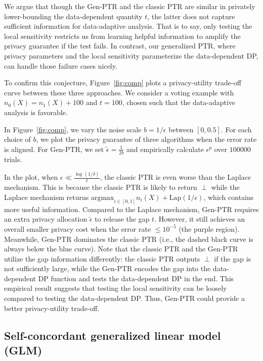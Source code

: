 We argue that though the Gen-PTR and the classic PTR are similar in privately lower-bounding the data-dependent quantity $t$, the latter does not capture sufficient information for data-adaptive analysis. That is to say, only testing the local sensitivity restricts us from learning helpful information to amplify the privacy guarantee if the test fails. In contrast, our generalized PTR, where privacy parameters and the  local sensitivity parameterize the data-dependent DP, can handle those failure cases nicely.

To confirm this conjecture, Figure~\ref{fig:comp} plots a privacy-utility trade-off curve between these three approaches.
We consider a voting example with $n_0(X)=n_1(X)+100$ and $t=100$, chosen such that the data-adaptive analysis is favorable. 

In Figure~\ref{fig:comp}, we vary the noise scale $b=1/\epsilon$ between $[0, 0.5]$. For each choice of $b$, we plot the privacy guarantee of three algorithms 
 when the error rate is aligned. For Gen-PTR, we set $\tilde{\epsilon} = \frac{1}{2b}$ and empirically calculate $\epsilon^p$ over $100000$ trials. 

In the plot, when $\epsilon \ll \frac{\log(1/\delta)}{t}$,  the classic PTR is even worse than the Laplace mechanism. This is because the classic PTR is likely to return $\perp$ while the Laplace mechanism returns $\text{argmax}_{i\in[0,1]} n_i(X) + \text{Lap}(1/\epsilon)$, which contains more useful information. 
Compared to the Laplace mechanism, Gen-PTR requires an extra privacy allocation $\tilde{\epsilon}$ to release the gap $t$. However, it still achieves an overall smaller privacy cost when the error rate $\leq 10^{-5}$ (the purple region).  
Meanwhile,  Gen-PTR dominates the classic PTR (i.e., the dashed black curve is always below the blue curve). Note that the classic PTR and the Gen-PTR utilize the gap information differently: the classic PTR outputs $\perp$ if the gap is not sufficiently large, while the Gen-PTR encodes the gap into the data-dependent DP function and tests the data-dependent DP in the end. This empirical result suggests that testing the local sensitivity can be loosely compared to testing the data-dependent DP. Thus, Gen-PTR could provide a better privacy-utility trade-off.


\subsection{Self-concordant generalized linear model (GLM)}\label{sec:glm}


